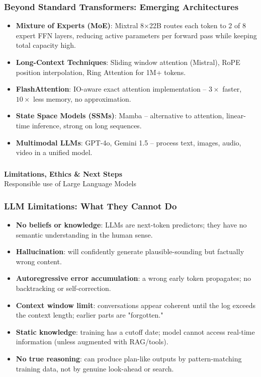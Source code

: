 \begin{frame}[fragile]\frametitle{Beyond Standard Transformers: Emerging Architectures}
\begin{itemize}
\item \textbf{Mixture of Experts (MoE)}: Mixtral 8×22B routes each token to 2 of 8 expert FFN layers, reducing active parameters per forward pass while keeping total capacity high.
\item \textbf{Long-Context Techniques}: Sliding window attention (Mistral), RoPE position interpolation, Ring Attention for 1M+ tokens.
\item \textbf{FlashAttention}: IO-aware exact attention implementation – $3\times$ faster, $10\times$ less memory, no approximation.
\item \textbf{State Space Models (SSMs)}: Mamba – alternative to attention, linear-time inference, strong on long sequences.
\item \textbf{Multimodal LLMs}: GPT-4o, Gemini 1.5 – process text, images, audio, video in a unified model.
\end{itemize}
\end{frame}



\begin{frame}[fragile]\frametitle{}
\begin{center}
{\Large \textbf{Limitations, Ethics \& Next Steps}}\\[0.5em]
{\normalsize Responsible use of Large Language Models}
\end{center}
\end{frame}

\begin{frame}[fragile]\frametitle{LLM Limitations: What They Cannot Do}
\begin{itemize}
\item \textbf{No beliefs or knowledge}: LLMs are next-token predictors; they have no semantic understanding in the human sense.
\item \textbf{Hallucination}: will confidently generate plausible-sounding but factually wrong content.
\item \textbf{Autoregressive error accumulation}: a wrong early token propagates; no backtracking or self-correction.
\item \textbf{Context window limit}: conversations appear coherent until the log exceeds the context length; earlier parts are "forgotten."
\item \textbf{Static knowledge}: training has a cutoff date; model cannot access real-time information (unless augmented with RAG/tools).
\item \textbf{No true reasoning}: can produce plan-like outputs by pattern-matching training data, not by genuine look-ahead or search.
\end{itemize}
\end{frame}

